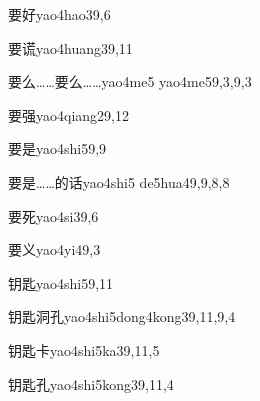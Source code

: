 \begin{entry}{要好}{yao4hao3}{9,6}
\end{entry}

\begin{entry}{要谎}{yao4huang3}{9,11}
\end{entry}

\begin{entry}{要么……要么……}{yao4me5 yao4me5}{9,3,9,3}
\end{entry}

\begin{entry}{要强}{yao4qiang2}{9,12}
\end{entry}

\begin{entry}{要是}{yao4shi5}{9,9}
\end{entry}

\begin{entry}{要是……的话}{yao4shi5 de5hua4}{9,9,8,8}
\end{entry}

\begin{entry}{要死}{yao4si3}{9,6}
\end{entry}

\begin{entry}{要义}{yao4yi4}{9,3}
\end{entry}

\begin{entry}{钥匙}{yao4shi5}{9,11}
\end{entry}

\begin{entry}{钥匙洞孔}{yao4shi5dong4kong3}{9,11,9,4}
\end{entry}

\begin{entry}{钥匙卡}{yao4shi5ka3}{9,11,5}
\end{entry}

\begin{entry}{钥匙孔}{yao4shi5kong3}{9,11,4}
\end{entry}

